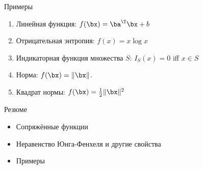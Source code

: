 \documentclass[12pt]{beamer}
\begin{document}
\begin{frame}{Примеры}
\begin{enumerate}
\item Линейная функция: $f(\bx) = \ba^{\T}\bx + b$
\item Отрицательная энтропия: $f(x) = x\log x$
\item Индикаторная функция множества $S$: $I_S(x) = 0$ iff $x \in S$
\item Норма: $f(\bx) = \|\bx\|$.
\item Квадрат нормы: $f(\bx) = \frac{1}{2}\|\bx\|^2$
\end{enumerate}
\end{frame}

\begin{frame}{Резюме}

\begin{itemize}
\item Сопряжённые функции
\item Неравенство Юнга-Фенхеля и другие свойства
\item Примеры
\end{itemize}

\end{frame}
\end{document}
